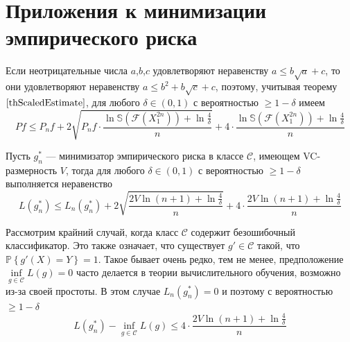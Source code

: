 \documentclass[12pt]{article}
\newtheorem{corollary}{\hskip\parindent Следствие}%
\begin{document}
\section{Приложения к минимизации эмпирического риска}
Если неотрицательные числа $a$,$b$,$c$ удовлетворяют неравенству $a\leqslant b\sqrt{a}+c$, то они удовлетворяют неравенству $a\leqslant b^2+b\sqrt{c}+c$, поэтому, учитывая теорему $\ref{thScaledEstimate}$, для любого $\delta\in(0,1)$ с вероятностью $\geqslant1-\delta$ имеем
\begin{equation*}
	Pf\leqslant P_nf+2\sqrt{P_nf\cdot\frac{\ln\mathbb{S}(\mathcal{F}(X_1^{2n}))+\ln\frac{4}{\delta}}{n}}+4\cdot\frac{\ln\mathbb{S}(\mathcal{F}(X_1^{2n}))+\ln\frac{4}{\delta}}{n}
\end{equation*}
\begin{corollary}\label{crRiskMinimizer}
	Пусть $g_n^*$ --- минимизатор эмпирического риска в классе $\mathcal{C}$, имеющем VC-размерность $V$, тогда для любого $\delta\in(0,1)$ с вероятностью $\geqslant1-\delta$ выполняется неравенство
	\begin{equation*}
		L(g_n^*)\leqslant L_n(g_n^*)+2\sqrt{\frac{2V\ln(n+1)+\ln\frac{4}{\delta}}{n}}+4\cdot\frac{2V\ln(n+1)+\ln\frac{4}{\delta}}{n}
	\end{equation*}
\end{corollary}

Рассмотрим крайний случай, когда класс $\mathcal{C}$ содержит безошибочный классификатор. Это также означает, что существует $g'\in\mathcal{C}$ такой, что $\mathbb{P}\left\{g'(X)=Y\right\}=1$. Такое бывает очень редко, тем не менее, предположение $\inf\limits_{g\in\mathcal{C}}L(g)=0$ часто делается в теории вычислительного обучения, возможно из-за своей простоты. В этом случае $L_n(g_n^*)=0$ и поэтому с вероятностью $\geqslant1-\delta$
\begin{equation*}
	L(g_n^*)-\inf\limits_{g\in\mathcal{C}}L(g)\leqslant4\cdot\frac{2V\ln(n+1)+\ln\frac{4}{\delta}}{n}
\end{equation*}
\end{document}
